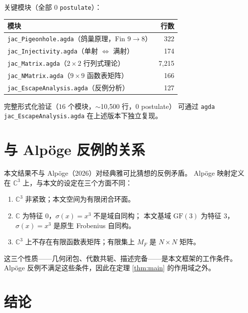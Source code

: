 \documentclass[a4paper,11pt]{article}
\theoremstyle{remark}
\newcommand{\GF}{\mathrm{GF}}
\newcommand{\C}{\mathbb{C}}
\newcommand{\MF}{M_F}
\newcommand{\Frob}{\sigma}
\begin{document}
关键模块（全部 $0$ \texttt{postulate}）：

\begin{center}
\begin{tabular}{l r}
\hline
模块 & 行数 \\
\hline
\texttt{jac\_Pigeonhole.agda}（鸽巢原理，Fin $9\to8$）& 322 \\
\texttt{jac\_Injectivity.agda}（单射 $\iff$ 满射）& 174 \\
\texttt{jac\_Matrix.agda}（$2\times2$ 行列式理论）& 7,215 \\
\texttt{jac\_NMatrix.agda}（$9\times9$ 函数表矩阵）& 166 \\
\texttt{jac\_EscapeAnalysis.agda}（反例分析）& 127 \\
\hline
\end{tabular}
\end{center}

完整形式化验证（$16$ 个模块，$\sim$10,500 行，$0$ postulate）
可通过 \texttt{agda jac\_EscapeAnalysis.agda} 在上述版本下独立复现。

\section{与 Alp\"{o}ge 反例的关系}

本文结果不与 Alp\"{o}ge（2026）对经典雅可比猜想的反例矛盾。
Alp\"{o}ge 映射定义在 $\C^3$ 上，与本文的设定在三个方面不同：

\begin{enumerate}
\item $\C^3$ 非紧致；本文空间为有限闭合环面。
\item $\C$ 为特征 $0$，$\Frob(x)=x^3$ 不是域自同构；
本文基域 $\GF(3)$ 为特征 $3$，$\Frob(x)=x^3$ 是原生 Frobenius 自同构。
\item $\C^3$ 上不存在有限函数表矩阵；有限集上 $\MF$ 是 $N\times N$ 矩阵。
\end{enumerate}

这三个性质——几何闭包、代数共轭、描述完备——是本文框架的工作条件。
Alp\"{o}ge 反例不满足这些条件，因此在定理 \ref{thm:main} 的作用域之外。

\section{结论}
\end{document}
